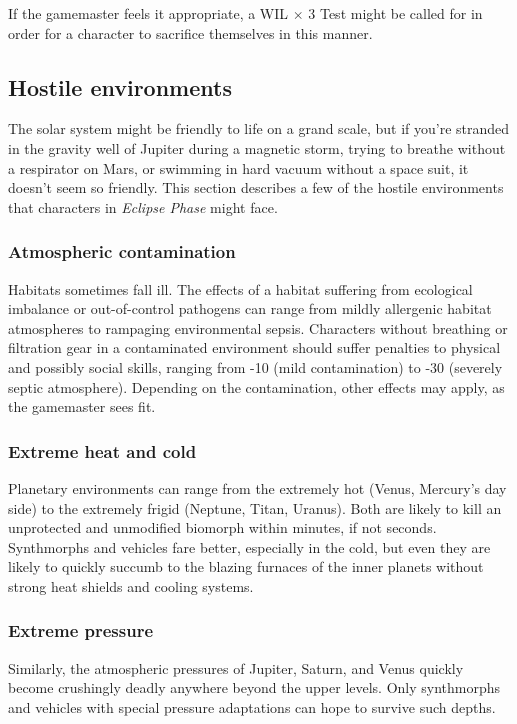 If the gamemaster feels it appropriate, a WIL $\times$ 3 Test might be called for in order for a character to sacrifice themselves in this manner. 

\subsection{Hostile environments} \label{sec:hostile-environments} The solar system might be friendly to life on a grand scale, but if you’re stranded in the gravity well of Jupiter during a magnetic storm, trying to breathe without a respirator on Mars, or swimming in hard vacuum without a space suit, it doesn’t seem so friendly. This section describes a few of the hostile environments that characters in \emph{Eclipse Phase} might face. 

\subsubsection{Atmospheric contamination} 

Habitats sometimes fall ill. The effects of a habitat suffering from ecological imbalance or out-of-control pathogens can range from mildly allergenic habitat atmospheres to rampaging environmental sepsis. Characters without breathing or filtration gear in a contaminated environment should suffer penalties to physical and possibly social skills, ranging from -10 (mild contamination) to -30 (severely septic atmosphere). Depending on the contamination, other effects may apply, as the gamemaster sees fit. 

\subsubsection{Extreme heat and cold} 

Planetary environments can range from the extremely hot (Venus, Mercury’s day side) to the extremely frigid (Neptune, Titan, Uranus). Both are likely to kill an unprotected and unmodified biomorph within minutes, if not seconds. Synthmorphs and vehicles fare better, especially in the cold, but even they are likely to quickly succumb to the blazing furnaces of the inner planets without strong heat shields and cooling systems. 

\subsubsection{Extreme pressure} 

Similarly, the atmospheric pressures of Jupiter, Saturn, and Venus quickly become crushingly deadly anywhere beyond the upper levels. Only synthmorphs and vehicles with special pressure adaptations can hope to survive such depths. 

